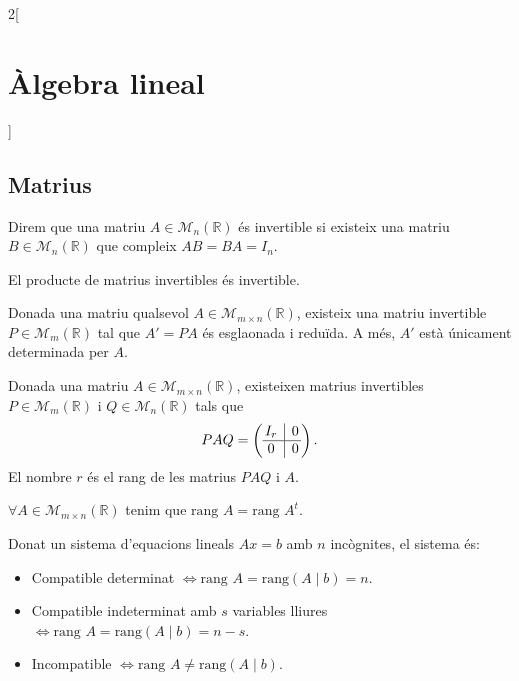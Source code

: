 \documentclass[class=article,10pt,crop=false]{standalone}
\begin{document}
\begin{multicols}{2}[\section{Àlgebra lineal}]
\subsection{Matrius}
\begin{definition}
Direm que una matriu $A\in\mathcal{M}_n(\mathbb{R})$ és invertible si existeix una matriu $B\in\mathcal{M}_n(\mathbb{R})$ que compleix $AB=BA=I_n$.
\end{definition}
\begin{lemma}
El producte de matrius invertibles és invertible.
\end{lemma}
\begin{theorem}
Donada una matriu qualsevol $A\in\mathcal{M}_{m\times n}(\mathbb{R})$, existeix una matriu invertible $P\in\mathcal{M}_m(\mathbb{R})$ tal que $A'=PA$ és esglaonada i reduïda. A més, $A'$ està únicament determinada per $A$.
\end{theorem}
\begin{theorem}
Donada una matriu $A\in\mathcal{M}_{m\times n}(\mathbb{R})$, existeixen matrius invertibles $P\in\mathcal{M}_m(\mathbb{R})$ i $Q\in\mathcal{M}_n(\mathbb{R})$ tals que $$PAQ=\left(\begin{array}{@{\,} c|c @{\,}}
    I_r & 0\\
    \hline
    0 & 0
    \end{array}\right).$$ El nombre $r$ és el rang de les matrius $PAQ$ i $A$.
\end{theorem}
\begin{prop}
$\forall A\in\mathcal{M}_{m\times n}(\mathbb{R})$ tenim que $\text{rang }A=\text{rang }A^t$.
\end{prop}
\begin{theorem}
Donat un sistema d'equacions lineals $Ax=b$ amb $n$ incògnites, el sistema és:
\begin{itemize}
    \item Compatible determinat $\iff\text{rang }A=\text{rang}(A\mid b)=n$.
    \item Compatible indeterminat amb $s$ variables lliures $\iff\text{rang }A=\text{rang}(A\mid b)=n-s$.
    \item Incompatible $\iff\text{rang }A\ne\text{rang}(A\mid b)$.
\end{itemize}

\end{theorem}
\end{multicols}
\end{document}
